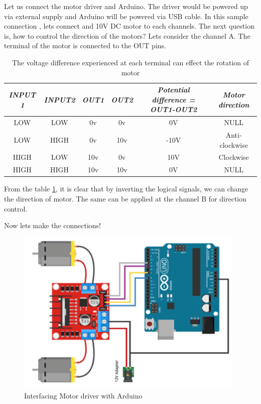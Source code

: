 \par Let us connect the motor driver and Arduino. The driver would be powered up via external supply and Arduino will be powered via USB cable. In this sample connection , lets connect and 10V DC motor to each channels. The next question is, how to control the direction of the motors? Lets consider the channel A. The terminal of the motor is connected to the OUT pins.

\begin{table}
    \centering
    \renewcommand{\arraystretch}{1.5}
    \begin{tabular}{|c|c|c|c|c|c|}
        \hline
        \textit{\textbf{INPUT 1}} &
          \textit{\textbf{INPUT2}} &
          \textit{\textbf{OUT1}} &
          \textit{\textbf{OUT2}} &
          \textit{\textbf{Potential difference = OUT1-OUT2}} &
          \textit{\textbf{Motor direction}} \\ \hline
        LOW  & LOW  & 0v  & 0v  & 0V   & NULL           \\ \hline
        LOW  & HIGH & 0v  & 10v & -10V & Anti-clockwise \\ \hline
        HIGH & LOW  & 10v & 0v  & 10V  & Clockwise      \\ \hline
        HIGH & HIGH & 10v & 10v & 0V   & NULL           \\ \hline
    \end{tabular}
    \vspace{3mm}
    \caption[Wheel potential difference]{The voltage difference experienced at each terminal can effect the rotation of motor}
    \label{fig:wheel_potential}
\end{table}


\par From the table \ref{fig:wheel_potential}, it is clear that by inverting the logical signals, we can change the direction of motor. The same can be applied at the channel B for direction control.
\par Now lets make the connections!

\begin{figure}
    \centering
    \includegraphics[width=4.3in]{Images/Motor_Driver/connection1.png}
    \caption{Interfacing Motor driver with Arduino}
    \label{fig:motor_connection}
\end{figure}

